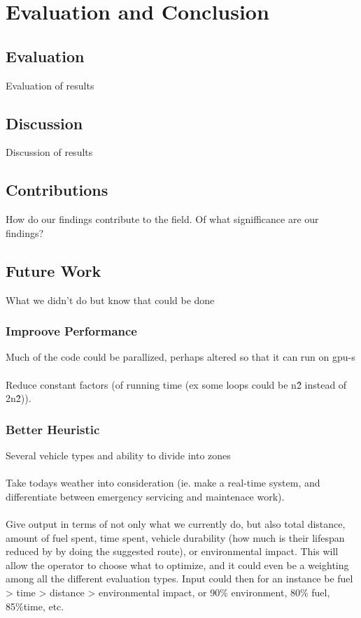 \chapter{Evaluation and Conclusion}

\section{Evaluation}
Evaluation of results

\section{Discussion}
Discussion of results

\section{Contributions}
How do our findings contribute to the field. Of what signifficance are our findings?

\section{Future Work}
What we didn't do but know that could be done

\subsection{Improove Performance}
Much of the code could be parallized, perhaps altered so that it can run on gpu-s
\\\\
Reduce constant factors (of running time (ex some loops could be n\^2 instead of 2\*n\^2)).

\subsection{Better Heuristic}
Several vehicle types and ability to divide into zones
\\\\
Take todays weather into consideration (ie. make a real-time system, and differentiate between emergency servicing and maintenace work).
\\\\
Give output in terms of not only what we currently do, but also total distance, amount of fuel spent, time spent, vehicle durability (how much is their lifespan reduced by by doing the suggested route), or environmental impact. This will allow the operator to choose what to optimize, and it could even be a weighting among all the different evaluation types. Input could then for an instance be fuel > time > distance > environmental impact, or 90\% environment, 80\% fuel, 85\%time, etc.

\cleardoublepage